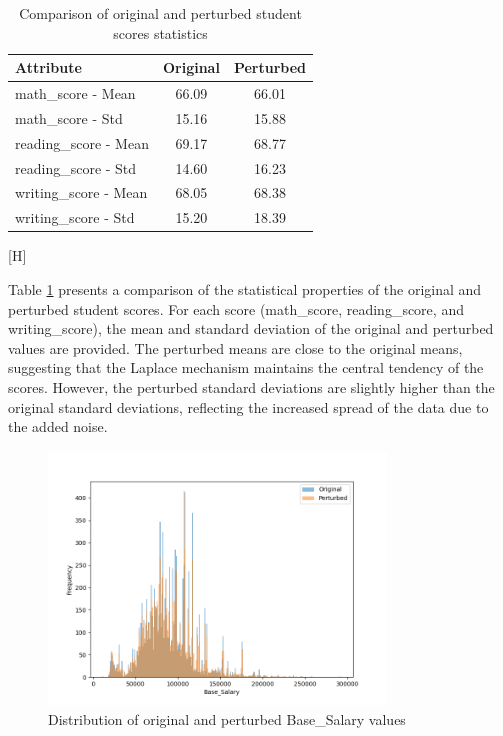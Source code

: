 \begin{table}[H]
\centering
\begin{tabular}{l|c|c}
\hline
\textbf{Attribute} & \textbf{Original} & \textbf{Perturbed} \\
\hline
math\_score - Mean & 66.09 & 66.01 \\
math\_score - Std & 15.16 & 15.88 \\
reading\_score - Mean & 69.17 & 68.77 \\
reading\_score - Std & 14.60 & 16.23 \\
writing\_score - Mean & 68.05 & 68.38 \\
writing\_score - Std & 15.20 & 18.39 \\
\hline
\end{tabular}[H]

\caption{Comparison of original and perturbed student scores statistics}
\label{tab:student_scores_stats}
\end{table}
Table \ref{tab:student_scores_stats} presents a comparison of the statistical properties of the original and perturbed student scores. For each score (math\_score, reading\_score, and writing\_score), the mean and standard deviation of the original and perturbed values are provided. The perturbed means are close to the original means, suggesting that the Laplace mechanism maintains the central tendency of the scores. However, the perturbed standard deviations are slightly higher than the original standard deviations, reflecting the increased spread of the data due to the added noise.

\begin{figure}[H]
\centering
\includegraphics[width=0.8\textwidth]{report/media/salaries.png}
\caption{Distribution of original and perturbed Base\_Salary values}
\label{fig:base_salary_distribution}
\end{figure}

